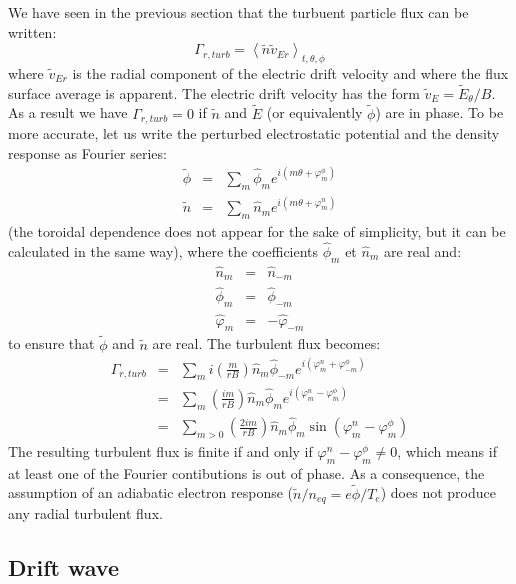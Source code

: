 We have seen in the previous section that the turbuent particle flux can be written:
\[
		\Gamma_{r,turb} = \left< \tilde{n}\tilde{v}_{Er} \right>_{t,\theta,\phi}
\]
where $\tilde{v}_{Er}$ is the radial component of the electric drift velocity and where the flux surface average is apparent. The electric drift velocity has the form $\tilde{v}_E = \tilde{E}_\theta/B$. As a result we have $\Gamma_{r,turb} = 0$ if $\tilde{n}$ and $\tilde{E}$ (or equivalently $\tilde{\phi}$) are in phase. To be more accurate, let us write the perturbed electrostatic potential and the density response as Fourier series:
\begin{eqnarray*}
		\tilde{\phi}  &  =  &  \sum_m \hat{\phi}_m e^{i\left( m\theta + \varphi_m^\phi \right)}		\\
		\tilde{n   }  &  =  &  \sum_m \hat{n}_m e^{i\left( m\theta + \varphi_m^n \right)}	
\end{eqnarray*}
(the toroidal dependence does not appear for the sake of simplicity, but it can be calculated in the same way), where the coefficients $\hat{\phi}_m$ et $\hat{n}_m$ are real and:
\begin{eqnarray*}
		\hat{n}_m     &  =  &  \hat{n}_{-m}			\\
		\hat{\phi}_m     &  =  &  \hat{\phi}_{-m}			\\
		\hat{\varphi}_m  &  =  &  - \hat{\varphi}_{-m}
\end{eqnarray*}
to ensure that $\tilde{\phi}$ and $\tilde{n}$ are real. The turbulent flux becomes:
\begin{eqnarray*}
		\Gamma_{r,turb}  &  =  &  \sum_m i \left( \frac{m}{rB} \right) \hat{n}_m \hat{\phi}_{-m} e^{i \left( \varphi_m^n + \varphi_{-m}^\phi \right)}		\\
										 &  =  &  \sum_m \left( \frac{im}{rB} \right) \hat{n}_m \hat{\phi}_m e^{i \left( \varphi_m^n - \varphi_m^\phi \right)}		\\
										 &  =  &  \sum_{m>0} \left( \frac{2im}{rB} \right)\hat{n}_m \hat{\phi}_m \sin \left( \varphi_m^n - \varphi_m^\phi \right)
\end{eqnarray*}
The resulting turbulent flux is finite if and only if $\varphi_m^n - \varphi_m^\phi \neq 0$, which means if at least one of the Fourier contibutions is out of phase. As a consequence, the assumption of an adiabatic electron response  ($\tilde{n}/n_{eq} = e\tilde{\phi}/T_e$) does not produce any radial turbulent flux.


				\subsection{Drift wave}
				\label{OndeDeDerive}
				
